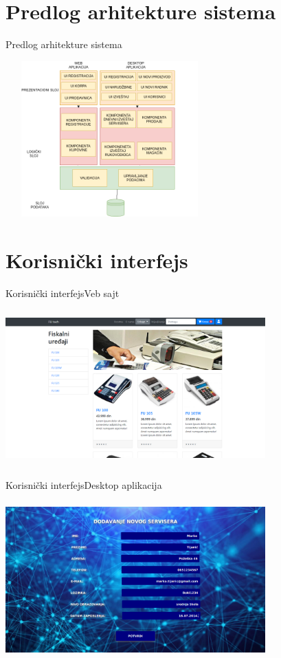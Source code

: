 \documentclass[9pt]{beamer}
\begin{document}
\section{Predlog arhitekture sistema}
\begin{frame}{Predlog arhitekture sistema}
    \begin{center}
        \includegraphics[width=8cm, height=6cm]{assets/ARHITEKTUR.png}
    \end{center}
\end{frame}

\section{Korisnički interfejs}

\begin{frame}{Korisnički interfejs}{Veb sajt}
    \begin{center}
        \includegraphics[width=10cm, height=6cm]{assets/fiskalniuredjaji.PNG}
    \end{center}
\end{frame}

\begin{frame}{Korisnički interfejs}{Desktop aplikacija}
    \begin{center}
        \includegraphics[width=10cm, height=6cm]{assets/APPadministratorDodajServ.png}
    \end{center}
\end{frame}
\end{document}
